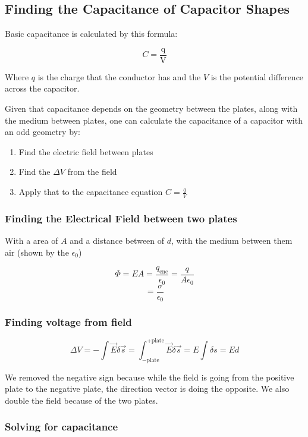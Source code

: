 \documentclass{article}
\begin{document}
\subsection{Finding the Capacitance of Capacitor Shapes}

Basic capacitance is calculated by this formula:

$$C = \frac{\text{q}}{\text{V}}$$

Where $q$ is the charge that the conductor has and the $V$ is the potential difference across the capacitor.

Given that capacitance depends on the geometry between the plates, along with the medium between plates, one can calculate the capacitance of a capacitor with an odd geometry by:

\begin{enumerate}
    \item Find the electric field between plates
    \item Find the $\Delta V$ from the field
    \item Apply that to the capacitance equation $C = \frac{q}{V}$
\end{enumerate}

\subsubsection{Finding the Electrical Field between two plates}

With a area of $A$ and a distance between of $d$, with the medium between them air (shown by the $\epsilon_0$)

$$\Phi = EA = \frac{q_{\text{enc}}}{\epsilon_0} = \frac{q}{A \epsilon_0}$$
$$= \frac{\sigma}{\epsilon_0}$$

\subsubsection{Finding voltage from field}

$$\Delta V = - \int \vec{E} \delta \vec{s} = \int_{-\text{plate}}^{+\text{plate}} \vec{E} \delta \vec{s} = E \int \delta s = Ed$$

We removed the negative sign because while the field is going from the positive plate to the negative plate, the direction vector is doing the opposite. We also double the field because of the two plates.

\subsubsection{Solving for capacitance}
\end{document}
